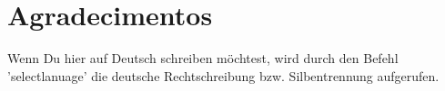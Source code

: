 \clearpage
\chapter*{\textbf{Agradecimentos}}\label{danksagung}

Wenn Du hier auf Deutsch schreiben möchtest, wird durch den Befehl 'selectlanuage' die deutsche Rechtschreibung bzw. Silbentrennung aufgerufen.


